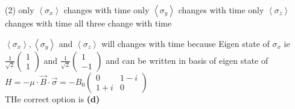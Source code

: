 \begin{enumerate}
\begin{tasks}(2)
	\task[\textbf{A.}] only $\left\langle\sigma_{x}\right\rangle$ changes with time
	\task[\textbf{B.}] only $\left\langle\sigma_{y}\right\rangle$ changes with time
	\task[\textbf{C.}]only $\left\langle\sigma_{z}\right\rangle$ changes with time
	\task[\textbf{D.}]all three change with time
\end{tasks}
\begin{answer}
 $\left\langle\sigma_{x}\right\rangle,\left\langle\sigma_{y}\right\rangle$ and $\left\langle\sigma_{z}\right\rangle$ will changes with time because Eigen state of $\sigma_{x}$ ie $\frac{1}{\sqrt{2}}\left(\begin{array}{l}1 \\ 1\end{array}\right)$ and $\frac{1}{\sqrt{2}}\left(\begin{array}{c}1 \\ -1\end{array}\right)$ and can be written in basis of eigen state of $H=-\mu \cdot \vec{B} \cdot \vec{\sigma}=-B_{0}\left(\begin{array}{cc}0 & 1-i \\ 1+i & 0\end{array}\right)$\\
 THe correct option is \textbf{(d)}
\end{answer}
\end{enumerate}






